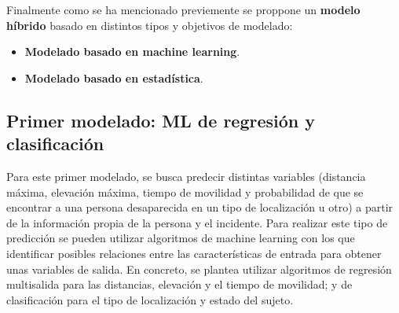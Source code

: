 Finalmente como se ha mencionado previemente se proppone un \textbf{modelo híbrido} basado en distintos tipos y objetivos de modelado:
\begin{itemize}
    \item \textbf{Modelado basado en machine learning}.
    \item \textbf{Modelado basado en estadística}.
\end{itemize}


\subsection{Primer modelado: ML de regresión y clasificación}
Para este primer modelado, se busca predecir distintas variables (distancia máxima, elevación máxima, tiempo de movilidad y probabilidad de que se encontrar a una persona desaparecida en un tipo de localización u otro) a partir de la información propia de la persona y el incidente. Para realizar este tipo de predicción se pueden utilizar algoritmos de machine learning con los que identificar posibles relaciones entre las características de entrada para obtener unas variables de salida. En concreto, se plantea utilizar algoritmos de regresión multisalida para las distancias, elevación y el tiempo de movilidad; y de clasificación para el tipo de localización y estado del sujeto. 

